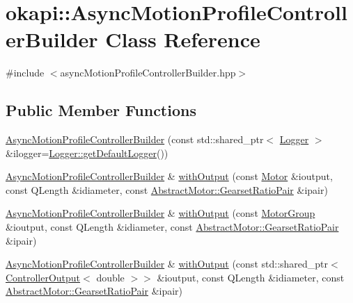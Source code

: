 \hypertarget{classokapi_1_1AsyncMotionProfileControllerBuilder}{}\section{okapi\+::Async\+Motion\+Profile\+Controller\+Builder Class Reference}
\label{classokapi_1_1AsyncMotionProfileControllerBuilder}


{\ttfamily \#include $<$async\+Motion\+Profile\+Controller\+Builder.\+hpp$>$}

\subsection*{Public Member Functions}
\begin{DoxyCompactItemize}
\item 
\mbox{\hyperlink{classokapi_1_1AsyncMotionProfileControllerBuilder_ab8f0219b48e74a8ceb72280f20f9b651}{Async\+Motion\+Profile\+Controller\+Builder}} (const std\+::shared\+\_\+ptr$<$ \mbox{\hyperlink{classokapi_1_1Logger}{Logger}} $>$ \&ilogger=\mbox{\hyperlink{classokapi_1_1Logger_a5053cf778b4b55acba788a3797dc96d2}{Logger\+::get\+Default\+Logger}}())
\item 
\mbox{\hyperlink{classokapi_1_1AsyncMotionProfileControllerBuilder}{Async\+Motion\+Profile\+Controller\+Builder}} \& \mbox{\hyperlink{classokapi_1_1AsyncMotionProfileControllerBuilder_a879afc5d6ea15d8bbebd737cd7e5a1d9}{with\+Output}} (const \mbox{\hyperlink{classokapi_1_1Motor}{Motor}} \&ioutput, const Q\+Length \&idiameter, const \mbox{\hyperlink{structokapi_1_1AbstractMotor_1_1GearsetRatioPair}{Abstract\+Motor\+::\+Gearset\+Ratio\+Pair}} \&ipair)
\item 
\mbox{\hyperlink{classokapi_1_1AsyncMotionProfileControllerBuilder}{Async\+Motion\+Profile\+Controller\+Builder}} \& \mbox{\hyperlink{classokapi_1_1AsyncMotionProfileControllerBuilder_a6afebe40f4ba878c23664ac34ccab860}{with\+Output}} (const \mbox{\hyperlink{classokapi_1_1MotorGroup}{Motor\+Group}} \&ioutput, const Q\+Length \&idiameter, const \mbox{\hyperlink{structokapi_1_1AbstractMotor_1_1GearsetRatioPair}{Abstract\+Motor\+::\+Gearset\+Ratio\+Pair}} \&ipair)
\item 
\mbox{\hyperlink{classokapi_1_1AsyncMotionProfileControllerBuilder}{Async\+Motion\+Profile\+Controller\+Builder}} \& \mbox{\hyperlink{classokapi_1_1AsyncMotionProfileControllerBuilder_a61c92b25221ce023394b31c6d7fd8638}{with\+Output}} (const std\+::shared\+\_\+ptr$<$ \mbox{\hyperlink{classokapi_1_1ControllerOutput}{Controller\+Output}}$<$ double $>$$>$ \&ioutput, const Q\+Length \&idiameter, const \mbox{\hyperlink{structokapi_1_1AbstractMotor_1_1GearsetRatioPair}{Abstract\+Motor\+::\+Gearset\+Ratio\+Pair}} \&ipair)
$$
\end{DoxyCompactItemize}
